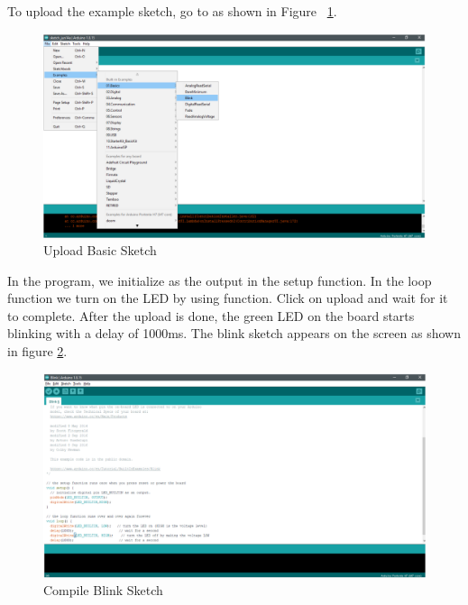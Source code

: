 To upload the example sketch, go to  as shown in Figure ~\ref{UploadSketch}. \\

\begin{figure}
	\begin{center}
		\includegraphics[width=0.7\linewidth]{Images/ArduinoIDE/UploadSketch.png}
		\caption{Upload Basic Sketch}
		\label{UploadSketch}
	\end{center}
\end{figure}

In the program, we initialize  as the output in the setup function. In the loop function we turn on the LED by using  function. Click on upload and wait for it to complete. After the upload is done, the green LED on the board starts blinking with a delay of 1000ms. The blink sketch appears on the screen as shown in figure \ref{CompileSketch}.

\begin{code}
	
\end{code}



\begin{figure}
	\begin{center}
		\includegraphics[width=0.7\linewidth]{Images/ArduinoIDE/CompileSketch.png}
		\caption{Compile Blink Sketch}
		\label{CompileSketch}
	\end{center}
\end{figure}


